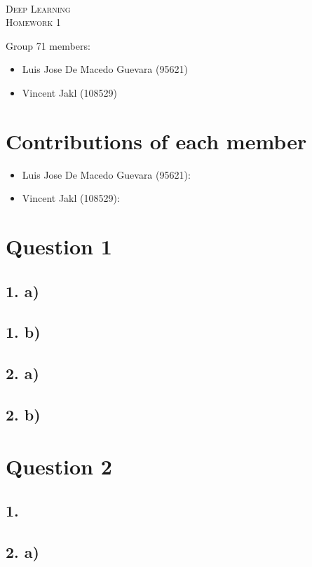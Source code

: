\documentclass[11pt]{article}
\begin{document}
\begin{center}
  \mbox{}\\[2.0cm]
  \textsc{\Huge Deep Learning}\\[1.0cm]
  \textsc{\Large Homework 1}\\[0.5cm]
\end{center}
\begin{flushleft}
  Group 71 members: \\[0.5cm]
  \begin{itemize}
  \item Luis Jose De Macedo Guevara (95621)
  \item Vincent Jakl (108529)
  \end{itemize}
\end{flushleft}

\section{Contributions of each member}
\begin{itemize}
    \item Luis Jose De Macedo Guevara (95621):
    \item Vincent Jakl (108529):
\end{itemize}
\pagebreak
\section{Question 1}
\subsection{1. a)}
\subsection{1. b)}
\subsection{2. a)}
\subsection{2. b)}
\pagebreak
\section{Question 2}
\subsection{1.}
\subsection{2. a)}
\end{document}
